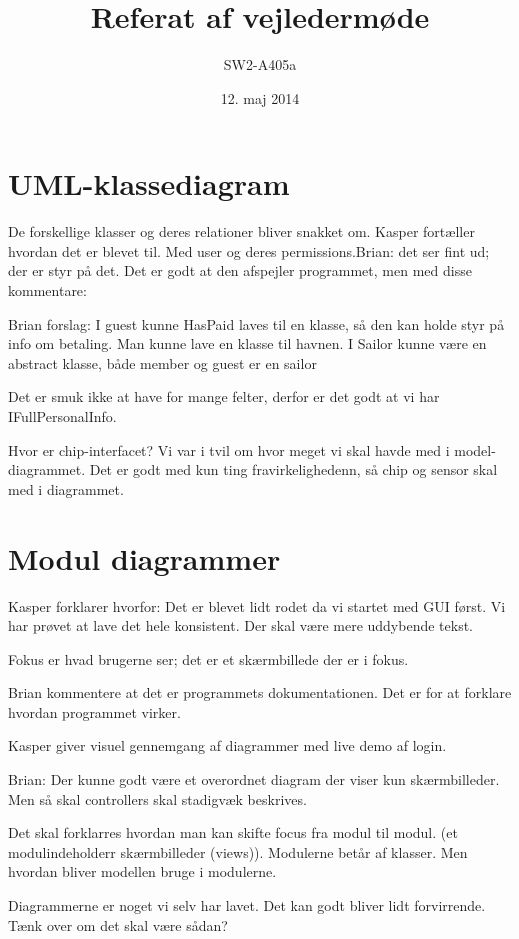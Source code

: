 \documentclass{article}
\begin{document}
\title{Referat af vejledermøde}
\author{SW2-A405a}
\date{12. maj 2014}
\maketitle
\section{UML-klassediagram}
De forskellige klasser og deres relationer bliver snakket om. Kasper fortæller hvordan det er blevet til. Med user og deres permissions.Brian: det ser fint ud; der er styr på det. Det er godt at den afspejler programmet, men med disse kommentare:

Brian forslag: I guest kunne HasPaid laves til en klasse, så den kan holde styr på info om betaling. Man kunne lave en klasse til havnen. I Sailor kunne være en abstract klasse, både member og guest er en sailor

Det er smuk ikke at have for mange felter, derfor er det godt at vi har IFullPersonalInfo.

Hvor er chip-interfacet? Vi var i tvil om hvor meget vi skal havde med i model-diagrammet. Det er godt med kun ting fravirkelighedenn, så chip og sensor skal med i diagrammet.

\section{Modul diagrammer}
Kasper forklarer hvorfor: Det er blevet lidt rodet da vi startet med GUI først. Vi har prøvet at lave det hele konsistent. Der skal være mere uddybende tekst.

Fokus er hvad brugerne ser; det er et skærmbillede der er i fokus.

Brian kommentere at det er programmets dokumentationen. Det er for at forklare hvordan programmet virker.

Kasper giver visuel gennemgang af diagrammer med live demo af login.

Brian: Der kunne godt være et overordnet diagram der viser kun skærmbilleder. Men så skal controllers skal stadigvæk beskrives.

Det skal forklarres hvordan man kan skifte focus fra modul til modul. (et modulindeholderr skærmbilleder (views)). Modulerne betår af klasser. Men hvordan bliver modellen bruge i modulerne.

Diagrammerne er noget vi selv har lavet. Det kan godt bliver lidt forvirrende. Tænk over om det skal være sådan?
\end{document}
